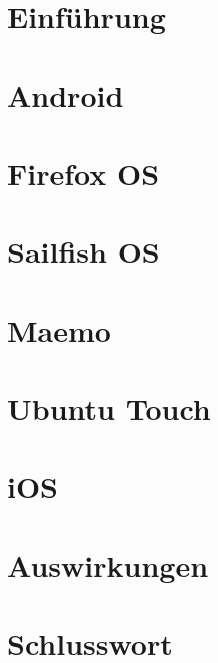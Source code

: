 \documentclass[a4paper,10pt,titlepage,twoside]{article}
\begin{document}
	
	\cleardoublepage
	
	\tableofcontents
	\cleardoublepage
	
	\pagestyle{fancyplain}
	\setcounter{page}{1}
	\newcommand{\HRule}{\rule{\linewidth}{0.5mm}}
	\fancyhead{}
	\fancyfoot{}
	\fancyfoot[RO,LE]{\thepage}
	\begin{multicols*}{2}

		\section{Einführung}
		
		\pagebreak
		
		\section{Android}
		
		\pagebreak
		
		\section{Firefox OS}
		
		\pagebreak
		
		\section{Sailfish OS}
		
		\pagebreak
		
		\section{Maemo}
		
		\pagebreak
		
		\section{Ubuntu Touch}
		
		\newline
		\newline
		
		\section{iOS}
		
		\pagebreak
		
		\section {Auswirkungen}
		
		\newline
		\newline
				
		\section{Schlusswort}
		
		\pagebreak
		
		\printbibliography
	\end{multicols*}
\end{document}
